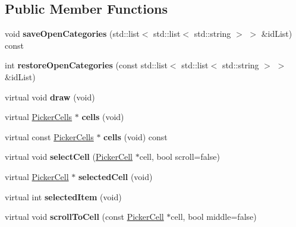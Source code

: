 \subsection*{Public Member Functions}
\begin{DoxyCompactItemize}
\item 
void {\bfseries save\+Open\+Categories} (std\+::list$<$ std\+::list$<$ std\+::string $>$ $>$ \&id\+List) const \hypertarget{classPicker_a7d88c122aef1c983b876525cb06cbd3a}{}\label{classPicker_a7d88c122aef1c983b876525cb06cbd3a}

\item 
int {\bfseries restore\+Open\+Categories} (const std\+::list$<$ std\+::list$<$ std\+::string $>$ $>$ \&id\+List)\hypertarget{classPicker_afaaab26a7b360ace074f710c5719dcd0}{}\label{classPicker_afaaab26a7b360ace074f710c5719dcd0}

\item 
virtual void {\bfseries draw} (void)\hypertarget{classPicker_a8aa6f5368c8ca76921b83f4743f25ae5}{}\label{classPicker_a8aa6f5368c8ca76921b83f4743f25ae5}

\item 
virtual \hyperlink{classPickerCells}{Picker\+Cells} $\ast$ {\bfseries cells} (void)\hypertarget{classPicker_ad2f05927cd5e3e803e8b43c6f8afb424}{}\label{classPicker_ad2f05927cd5e3e803e8b43c6f8afb424}

\item 
virtual const \hyperlink{classPickerCells}{Picker\+Cells} $\ast$ {\bfseries cells} (void) const \hypertarget{classPicker_a59be072e1915d5411f59a07c46ed873b}{}\label{classPicker_a59be072e1915d5411f59a07c46ed873b}

\item 
virtual void {\bfseries select\+Cell} (\hyperlink{classPickerCell}{Picker\+Cell} $\ast$cell, bool scroll=false)\hypertarget{classPicker_a218f741e0aeb6b4133c943fd0bc54948}{}\label{classPicker_a218f741e0aeb6b4133c943fd0bc54948}

\item 
virtual \hyperlink{classPickerCell}{Picker\+Cell} $\ast$ {\bfseries selected\+Cell} (void)\hypertarget{classPicker_a1e405570b64522d15f5028b6b1bc7fd4}{}\label{classPicker_a1e405570b64522d15f5028b6b1bc7fd4}

\item 
virtual int {\bfseries selected\+Item} (void)\hypertarget{classPicker_a84467d876fb19d30fa928de800a09775}{}\label{classPicker_a84467d876fb19d30fa928de800a09775}

\item 
virtual void {\bfseries scroll\+To\+Cell} (const \hyperlink{classPickerCell}{Picker\+Cell} $\ast$cell, bool middle=false)\hypertarget{classPicker_af787de9f5861e03362b9e4367a995ecd}{}\label{classPicker_af787de9f5861e03362b9e4367a995ecd}


\end{DoxyCompactItemize}
